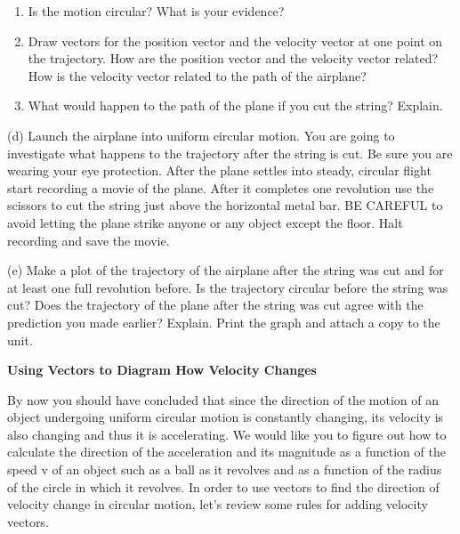 \begin{enumerate}
\item Is the motion circular? What is your evidence?
\answerspace{10mm}

\item Draw vectors for the position vector and the velocity vector at one point on
the trajectory. How are the position vector and the velocity vector related? How is the velocity vector
related to the path of the airplane?
\answerspace{30mm}

\item What would happen to the path of the plane if you cut the string? Explain.
\answerspace{20mm}

\end{enumerate}

\pagebreak
(d) Launch the airplane into uniform circular motion. You are going to investigate
what happens to the trajectory after the string is cut. Be sure you are wearing
your eye protection. After the plane settles into steady, circular flight start
recording a movie of the plane. After it completes one revolution use the scissors
to cut the string just above the horizontal metal bar. BE CAREFUL to avoid letting
the plane strike anyone or any object except the floor. Halt recording and save
the movie.

(e) Make a plot of the trajectory of the airplane after the string was cut and
for at least one full revolution before. Is the trajectory circular before the
string was cut? Does the trajectory of the plane after the string was cut agree
with the prediction you made earlier? Explain. Print the graph and attach a
copy to the unit.
\vspace{20mm}

\textbf{Using Vectors to Diagram How Velocity Changes} 

By now you should have concluded that since the direction of the motion of an
object undergoing uniform circular motion is constantly changing, its velocity
is also changing and thus it is accelerating. We would like you to figure out
how to calculate the direction of the acceleration and its magnitude as a function
of the speed v of an object such as a ball as it revolves and as a function
of the radius of the circle in which it revolves. In order to use vectors to
find the direction of velocity change in circular motion, let's review some
rules for adding velocity vectors.

